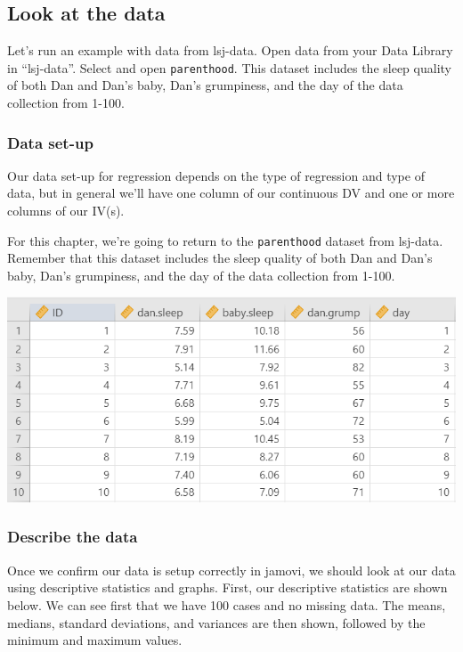 \documentclass[
]{book}
\begin{document}
\hypertarget{look-at-the-data-9}{%
\subsection{Look at the data}\label{look-at-the-data-9}}

Let's run an example with data from lsj-data. Open data from your Data Library in ``lsj-data''. Select and open \texttt{parenthood}. This dataset includes the sleep quality of both Dan and Dan's baby, Dan's grumpiness, and the day of the data collection from 1-100.

\hypertarget{data-set-up-9}{%
\subsubsection{Data set-up}\label{data-set-up-9}}

Our data set-up for regression depends on the type of regression and type of data, but in general we'll have one column of our continuous DV and one or more columns of our IV(s).

For this chapter, we're going to return to the \texttt{parenthood} dataset from lsj-data. Remember that this dataset includes the sleep quality of both Dan and Dan's baby, Dan's grumpiness, and the day of the data collection from 1-100.

\includegraphics{images/08-correlation/correlation-data.png}

\hypertarget{describe-the-data-7}{%
\subsubsection{Describe the data}\label{describe-the-data-7}}

Once we confirm our data is setup correctly in jamovi, we should look at our data using descriptive statistics and graphs. First, our descriptive statistics are shown below. We can see first that we have 100 cases and no missing data. The means, medians, standard deviations, and variances are then shown, followed by the minimum and maximum values.
\end{document}
